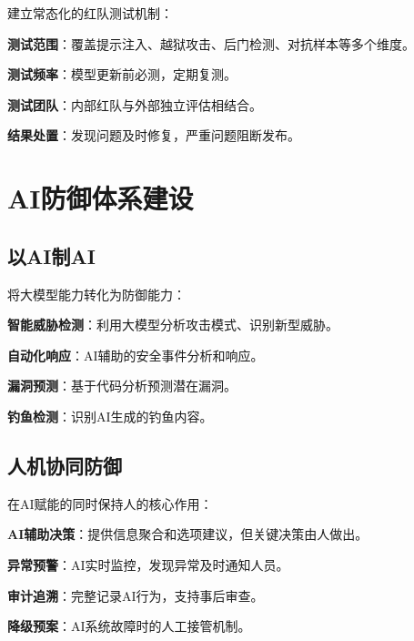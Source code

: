 建立常态化的红队测试机制：

\textbf{测试范围}：覆盖提示注入、越狱攻击、后门检测、对抗样本等多个维度。

\textbf{测试频率}：模型更新前必测，定期复测。

\textbf{测试团队}：内部红队与外部独立评估相结合。

\textbf{结果处置}：发现问题及时修复，严重问题阻断发布。

\section{AI防御体系建设}

\subsection{以AI制AI}

将大模型能力转化为防御能力：

\textbf{智能威胁检测}：利用大模型分析攻击模式、识别新型威胁。

\textbf{自动化响应}：AI辅助的安全事件分析和响应。

\textbf{漏洞预测}：基于代码分析预测潜在漏洞。

\textbf{钓鱼检测}：识别AI生成的钓鱼内容。

\subsection{人机协同防御}

在AI赋能的同时保持人的核心作用：

\textbf{AI辅助决策}：提供信息聚合和选项建议，但关键决策由人做出。

\textbf{异常预警}：AI实时监控，发现异常及时通知人员。

\textbf{审计追溯}：完整记录AI行为，支持事后审查。

\textbf{降级预案}：AI系统故障时的人工接管机制。
